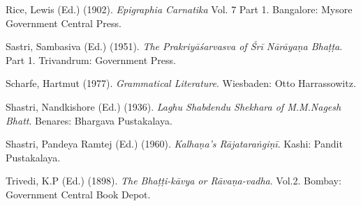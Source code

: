 \begin{thebibliography}{99}
Rice, Lewis (Ed.) (1902). {\sl Epigraphia Carnatika} Vol. 7 Part 1. Bangalore: Mysore Government Central Press. 

Sastri, Sambasiva (Ed.) (1951). {\sl The Prakriyāśarvasva of Śrī Nārāyaṇa Bhaṭṭa}. Part 1. Trivandrum: Government Press. 

Scharfe, Hartmut (1977). {\sl Grammatical Literature}. Wiesbaden: Otto Harrassowitz. 

Shastri, Nandkishore (Ed.) (1936). {\sl Laghu Shabdendu Shekhara of M.M.Nagesh Bhatt}. Benares: Bhargava Pustakalaya. 

Shastri, Pandeya Ramtej (Ed.) (1960). {\sl Kalhaṇa’s Rājataraṅgiṇī}. Kashi: Pandit Pustakalaya. 

Trivedi, K.P (Ed.) (1898). {\sl The Bhaṭṭi-kāvya or Rāvaṇa-vadha}. Vol.2. Bombay: Government Central Book Depot. 
\end{thebibliography}

\theendnotes
\label{chapter\thechapter:end}
